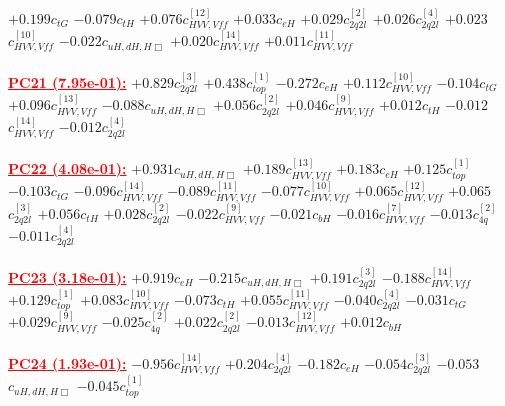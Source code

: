 \documentclass{article}
\begin{document}
{$+0.199$}{\rm $c_{tG}$}
{$-0.079$}{\rm $c_{tH}$}
{$+0.076$}{\rm $c_{HVV,Vff}^{[12]}$}
{$+0.033$}{\rm $c_{eH}$}
{$+0.029$}{\rm $c_{2q2l}^{[2]}$}
{$+0.026$}{\rm $c_{2q2l}^{[4]}$}
{$+0.023$}{\rm $c_{HVV,Vff}^{[10]}$}
{$-0.022$}{\rm $c_{uH,dH,H\Box}$}
{$+0.020$}{\rm $c_{HVV,Vff}^{[14]}$}
{$+0.011$}{\rm $c_{HVV,Vff}^{[11]}$}
 \nonumber \\ \nonumber \\
\noindent \textcolor{red}{\underline{\bf{PC21} (7.95e-01):}}
{$+0.829$}{\rm $c_{2q2l}^{[3]}$}
{$+0.438$}{\rm $c_{top}^{[1]}$}
{$-0.272$}{\rm $c_{eH}$}
{$+0.112$}{\rm $c_{HVV,Vff}^{[10]}$}
{$-0.104$}{\rm $c_{tG}$}
{$+0.096$}{\rm $c_{HVV,Vff}^{[13]}$}
{$-0.088$}{\rm $c_{uH,dH,H\Box}$}
{$+0.056$}{\rm $c_{2q2l}^{[2]}$}
{$+0.046$}{\rm $c_{HVV,Vff}^{[9]}$}
{$+0.012$}{\rm $c_{tH}$}
{$-0.012$}{\rm $c_{HVV,Vff}^{[14]}$}
{$-0.012$}{\rm $c_{2q2l}^{[4]}$}
 \nonumber \\ \nonumber \\
\noindent \textcolor{red}{\underline{\bf{PC22} (4.08e-01):}}
{$+0.931$}{\rm $c_{uH,dH,H\Box}$}
{$+0.189$}{\rm $c_{HVV,Vff}^{[13]}$}
{$+0.183$}{\rm $c_{eH}$}
{$+0.125$}{\rm $c_{top}^{[1]}$}
{$-0.103$}{\rm $c_{tG}$}
{$-0.096$}{\rm $c_{HVV,Vff}^{[14]}$}
{$-0.089$}{\rm $c_{HVV,Vff}^{[11]}$}
{$-0.077$}{\rm $c_{HVV,Vff}^{[10]}$}
{$+0.065$}{\rm $c_{HVV,Vff}^{[12]}$}
{$+0.065$}{\rm $c_{2q2l}^{[3]}$}
{$+0.056$}{\rm $c_{tH}$}
{$+0.028$}{\rm $c_{2q2l}^{[2]}$}
{$-0.022$}{\rm $c_{HVV,Vff}^{[9]}$}
{$-0.021$}{\rm $c_{bH}$}
{$-0.016$}{\rm $c_{HVV,Vff}^{[7]}$}
{$-0.013$}{\rm $c_{4q}^{[2]}$}
{$-0.011$}{\rm $c_{2q2l}^{[4]}$}
 \nonumber \\ \nonumber \\
\noindent \textcolor{red}{\underline{\bf{PC23} (3.18e-01):}}
{$+0.919$}{\rm $c_{eH}$}
{$-0.215$}{\rm $c_{uH,dH,H\Box}$}
{$+0.191$}{\rm $c_{2q2l}^{[3]}$}
{$-0.188$}{\rm $c_{HVV,Vff}^{[14]}$}
{$+0.129$}{\rm $c_{top}^{[1]}$}
{$+0.083$}{\rm $c_{HVV,Vff}^{[10]}$}
{$-0.073$}{\rm $c_{tH}$}
{$+0.055$}{\rm $c_{HVV,Vff}^{[11]}$}
{$-0.040$}{\rm $c_{2q2l}^{[4]}$}
{$-0.031$}{\rm $c_{tG}$}
{$+0.029$}{\rm $c_{HVV,Vff}^{[9]}$}
{$-0.025$}{\rm $c_{4q}^{[2]}$}
{$+0.022$}{\rm $c_{2q2l}^{[2]}$}
{$-0.013$}{\rm $c_{HVV,Vff}^{[12]}$}
{$+0.012$}{\rm $c_{bH}$}
 \nonumber \\ \nonumber \\
\noindent \textcolor{red}{\underline{\bf{PC24} (1.93e-01):}}
{$-0.956$}{\rm $c_{HVV,Vff}^{[14]}$}
{$+0.204$}{\rm $c_{2q2l}^{[4]}$}
{$-0.182$}{\rm $c_{eH}$}
{$-0.054$}{\rm $c_{2q2l}^{[3]}$}
{$-0.053$}{\rm $c_{uH,dH,H\Box}$}
{$-0.045$}{\rm $c_{top}^{[1]}$}
\end{document}
